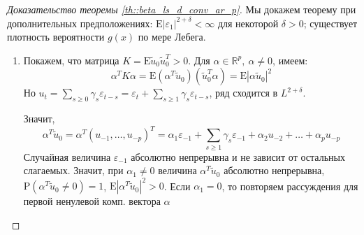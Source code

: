 \documentclass[12pt]{article}
\def\eps{ \varepsilon }
\def\R{ \mathbb{R} }
\def\E{ \mathrm{E} }
\def\P{ \mathrm{P} }
\begin{document}
\begin{proof}[Доказательство теоремы \ref{th::beta_ls_d_conv_ar_p}]
    Мы докажем теорему при дополнительных предположениях: $\E\left\lvert \eps_1\right\rvert ^{2+\delta}<\infty$ для некоторой $\delta>0$;
    существует плотность вероятности $g(x)$ по мере Лебега.
    \begin{enumerate}
        \item Покажем, что матрица $K=\E\widetilde{u}_0\widetilde{u}_0^T>0$. Для $\alpha\in\R^p,\ \alpha\neq0$, имеем:
        \[\alpha^TK\alpha=\E(\alpha^T\widetilde{u}_0)(\widetilde{u}_0^T\alpha)=\E\left\lvert \alpha\widetilde{u}_0\right\rvert ^2\]
        Но $u_t=\sum_{s\geq0}\gamma_s\eps_{t-s}=\eps_t+\sum_{s\geq1}\gamma_s\eps_{t-s}$, ряд сходится в $L^{2+\delta}$.

        Значит, 
        \[\alpha^T\widetilde{u}_0=\alpha^T(u_{-1},\ldots,u_{-p})^T=\alpha_1\eps_{-1}+\sum_{s\geq1}\gamma_s\eps_{-1}+\alpha_2u_{-2}+\ldots+\alpha_pu_{-p}\]
        Случайная величина $\eps_{-1}$ абсолютно непрерывна и не зависит от остальных слагаемых. Значит, при $\alpha_1\neq0$
        величина $\alpha^T\widetilde{u}_0$ абсолютно непрерывна, $\P(\alpha^T\widetilde{u}_0\neq0)=1$, $\E\left\lvert \alpha^T\widetilde{u}_0\right\rvert ^2>0$.
        Если $\alpha_1=0$, то повторяем рассуждения для первой ненулевой комп. вектора $\alpha$


\end{enumerate}
\end{proof}
\end{document}
